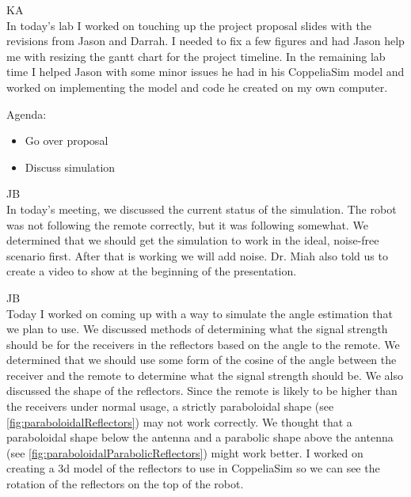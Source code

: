 \documentclass[fontsize=11pt, %
                             paper=letter, %
                             openany, %
                             captions=tableheading,
                             index=totoc,
                             hyperref]{labbook}
\begin{document}
\begin{addmargin}[0cm]{0cm}
\vspace*{12pt}
\vspace*{12pt}
KA\\
In today's lab I worked on touching up the project proposal slides with the revisions from Jason and Darrah. I needed to fix a few figures and had Jason help me with resizing the gantt chart for the project timeline. In the remaining lab time I helped Jason with some minor issues he had in his CoppeliaSim model and worked on implementing the model and code he created on my own computer.

Agenda: 
\begin{itemize}
    \item Go over proposal
    \item Discuss simulation
\end{itemize}

JB\\
In today's meeting, we discussed the current status of the simulation. The robot was not following the remote correctly, but it was following somewhat. We determined that we should get the simulation to work in the ideal, noise-free scenario first. After that is working we will add noise. Dr. Miah also told us to create a video to show at the beginning of the presentation.



JB\\
Today I worked on coming up with a way to simulate the angle estimation that we plan to use. We discussed methods of determining what the signal strength should be for the receivers in the reflectors based on the angle to the remote. We determined that we should use some form of the cosine of the angle between the receiver and the remote to determine what the signal strength should be. We also discussed the shape of the reflectors. Since the remote is likely to be higher than the receivers under normal usage, a strictly paraboloidal shape (see \autoref{fig:paraboloidalReflectors}) may not work correctly. We thought that a paraboloidal shape below the antenna and a parabolic shape above the antenna (see \autoref{fig:paraboloidalParabolicReflectors}) might work better. I worked on creating a 3d model of the reflectors to use in CoppeliaSim so we can see the rotation of the reflectors on the top of the robot.


\end{addmargin}
\end{document}
